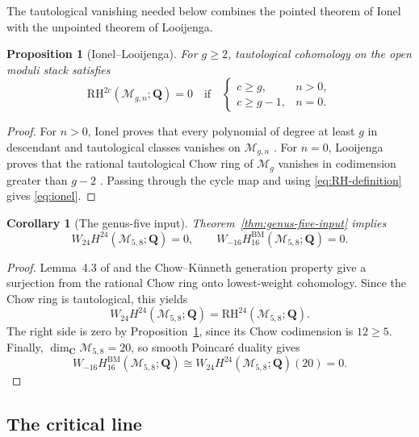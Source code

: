 \documentclass[12pt,reqno]{amsart}
\newcommand{\Q}{\mathbf{Q}}
\newcommand{\C}{\mathbf{C}}
\newcommand{\M}{\mathcal{M}}
\newcommand{\BM}{\mathrm{BM}}
\newcommand{\RH}{\mathrm{RH}}
\newtheorem{proposition}[theorem]{Proposition}
\newtheorem{corollary}[theorem]{Corollary}
\theoremstyle{definition}
\theoremstyle{remark}
\begin{document}
The tautological vanishing needed below combines the pointed theorem of
Ionel with the unpointed theorem of Looijenga.

\begin{proposition}[Ionel--Looijenga]\label{prop:ionel}
For $g\geq2$, tautological cohomology on the open moduli stack satisfies
\begin{equation}\label{eq:ionel}
 \RH^{2c}(\M_{g,n};\Q)=0
 \quad\text{if}\quad
 \begin{cases}
 c\geq g,&n>0,\\
 c\geq g-1,&n=0.
 \end{cases}
\end{equation}
\end{proposition}

\begin{proof}
For $n>0$, Ionel proves that every polynomial of degree at least $g$ in
descendant and tautological classes vanishes on $\M_{g,n}$
\cite[Theorem~0.1]{Ionel}.  For $n=0$, Looijenga proves that the rational
tautological Chow ring of $\M_g$ vanishes in codimension greater than
$g-2$ \cite[Theorem~1.1]{Looijenga}.  Passing through the cycle map and
using \eqref{eq:RH-definition} gives \eqref{eq:ionel}.
\end{proof}

\begin{corollary}[The genus-five input]\label{cor:liu-input}
Theorem~\ref{thm:genus-five-input} implies
\begin{equation}\label{eq:liu-consequence}
 W_{24}H^{24}(\M_{5,8};\Q)=0,
 \qquad
 W_{-16}H^{\BM}_{16}(\M_{5,8};\Q)=0.
\end{equation}
\end{corollary}

\begin{proof}
Lemma~4.3 of \cite{CLP} and the Chow--K\"unneth generation property give a
surjection from the rational Chow ring onto lowest-weight cohomology.
Since the Chow ring is tautological, this yields
\[
 W_{24}H^{24}(\M_{5,8};\Q)=\RH^{24}(\M_{5,8};\Q).
\]
The right side is zero by Proposition~\ref{prop:ionel}, since its Chow
codimension is $12\geq5$.  Finally, $\dim_{\C}\M_{5,8}=20$, so smooth
Poincar\'e duality gives
\[
 W_{-16}H^{\BM}_{16}(\M_{5,8};\Q)
 \cong W_{24}H^{24}(\M_{5,8};\Q)(20)=0.
\]
\end{proof}

\subsection{The critical line}
\end{document}
